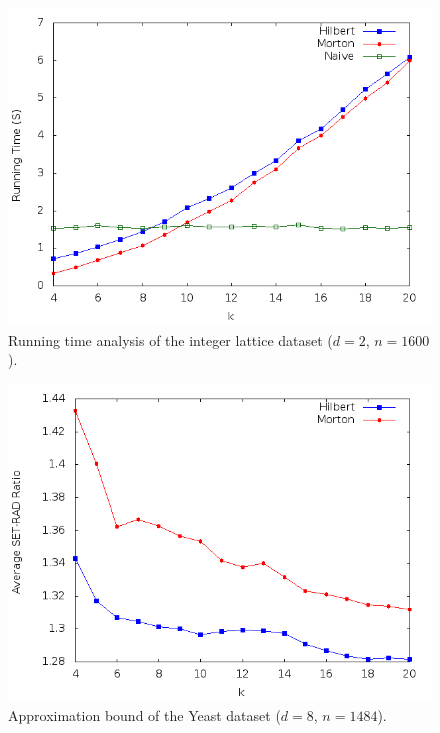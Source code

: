\documentclass[10pt]{article}
\begin{document}
\begin{figure}
\begin{center}
\includegraphics[scale=0.5]{LatGra.png}
\caption{Running time analysis of the integer lattice dataset ($d = 2$, $n = 1600$).}
\label{run-lattice}
\end{center}
\end{figure}

\begin{figure}
\begin{center}
\includegraphics[scale=0.5]{YeaGra2.png}
\caption{Approximation bound of the Yeast dataset ($d = 8$, $n = 1484$).}
\label{approx-yeast}
\end{center}
\end{figure}
\end{document}
